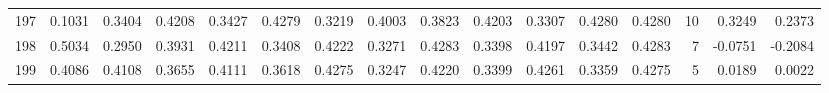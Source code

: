 \begin{tabular}{lrrrrrrrrrrrrrrr}
197 &      0.1031 &  0.3404 &  0.4208 &  0.3427 &  0.4279 &  0.3219 &  0.4003 &  0.3823 &  0.4203 &  0.3307 &   0.4280 &     0.4280 &     10 &                    0.3249 &                     0.2373 \\
198 &      0.5034 &  0.2950 &  0.3931 &  0.4211 &  0.3408 &  0.4222 &  0.3271 &  0.4283 &  0.3398 &  0.4197 &   0.3442 &     0.4283 &      7 &                   -0.0751 &                    -0.2084 \\
199 &      0.4086 &  0.4108 &  0.3655 &  0.4111 &  0.3618 &  0.4275 &  0.3247 &  0.4220 &  0.3399 &  0.4261 &   0.3359 &     0.4275 &      5 &                    0.0189 &                     0.0022 \\
\bottomrule
\end{tabular}

